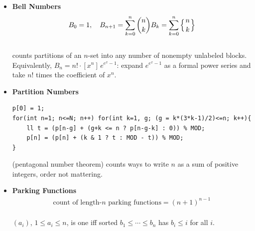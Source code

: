 \begin{itemize}
    \item \textbf{Bell Numbers} \\
    \begin{equation*}
    \begin{aligned}
    B_0 = 1, \quad B_{n+1} = \sum_{k=0}^n \binom{n}{k} B_k = \sum_{k=0}^n \left\{{n\atop k}\right\}
    \end{aligned}
    \end{equation*} \\
    counts partitions of an $n$-set into any number of nonempty unlabeled blocks.
    Equivalently, $B_n = n! \cdot [x^n]\, e^{e^x - 1}$: expand $e^{e^x-1}$ as a formal power series and take $n!$ times the coefficient of $x^n$.

    \item \textbf{Partition Numbers}
\begin{verbatim}
p[0] = 1;
for(int n=1; n<=N; n++) for(int k=1, g; (g = k*(3*k-1)/2)<=n; k++){
    ll t = (p[n-g] + (g+k <= n ? p[n-g-k] : 0)) % MOD;
    p[n] = (p[n] + (k & 1 ? t : MOD - t)) % MOD;
}
\end{verbatim}
    (pentagonal number theorem) counts ways to write $n$ as a sum of positive integers, order not mattering.

    \item \textbf{Parking Functions} \\
    \begin{equation*}
    \begin{aligned}
    \text{count of length-}n\text{ parking functions} = (n+1)^{n-1}
    \end{aligned}
    \end{equation*} \\
    $(a_i)$, $1 \leq a_i \leq n$, is one iff sorted $b_1 \leq \cdots \leq b_n$ has $b_i \leq i$ for all $i$.


\end{itemize}
